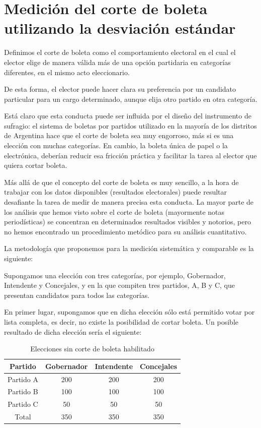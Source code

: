 \documentclass[12pt,a4paper]{article}
\begin{document}
\section{Medición del corte de boleta utilizando la desviación estándar}
Definimos el corte de boleta como el comportamiento electoral en el cual el
elector elige de manera válida más de una opción partidaria en categorías diferentes, en el mismo
acto eleccionario.

De esta forma, el elector puede hacer clara su preferencia por un candidato
particular para un cargo determinado, aunque elija otro partido en otra
categoría.

Está claro que esta conducta puede ser influida por el diseño del
instrumento de sufragio: el sistema de boletas por partidos utilizado en la
mayoría de los distritos de Argentina hace que el corte de boleta sea muy
engorroso, más si es una elección con muchas categorías. En cambio, la boleta
única de papel o la electrónica, deberían reducir esa fricción práctica y
facilitar la tarea al elector que quiera cortar boleta.

Más allá de que el concepto del corte de boleta es muy sencillo, a la hora de
trabajar con los datos disponibles (resultados electorales) puede resultar
desafiante la tarea de medir de manera precisa esta conducta. La mayor parte de
los análisis que hemos visto sobre el corte de boleta (mayormente notas
periodísticas) se concentran en determinados resultados visibles y notorios,
pero no hemos encontrado un procedimiento metódico para su análisis cuantitativo.

La metodología que proponemos para la medición sistemática y comparable es la
siguiente:

Supongamos una elección con tres categorías, por ejemplo, Gobernador, Intendente
y Concejales, y en la que compiten tres partidos, A, B y C, que presentan
candidatos para todos las categorías.

En primer lugar, supongamos que en dicha elección sólo está permitido votar por
lista completa, es decir, no existe la posibilidad de cortar boleta. Un posible
resultado de dicha elección sería el siguiente:

\renewcommand{\arraystretch}{1.25}
\begin{table}[h!]
\centering
\begin{tabular}{c c c c} 
 Partido & Gobernador & Intendente & Concejales \\ [0.5ex] 
 \hline
Partido A & 200 & 200 & 200 \\
Partido B & 100 & 100 & 100 \\
Partido C & 50 & 50 & 50 \\
 \hline
Total & 350 & 350 & 350 \\ [1ex]
 \hline
\end{tabular}
\caption{Elecciones sin corte de boleta habilitado}
\label{table:1}
\end{table}
\end{document}
